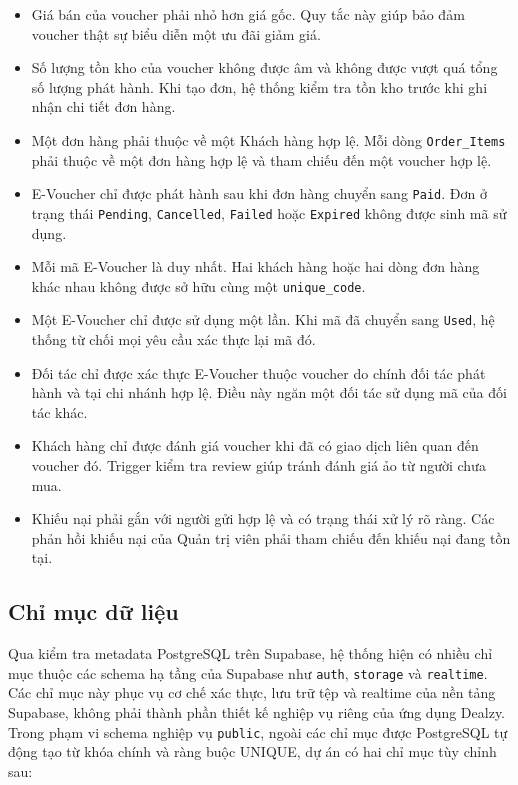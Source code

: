 \begin{itemize}[leftmargin=1.2cm]
    \item Giá bán của voucher phải nhỏ hơn giá gốc. Quy tắc này giúp bảo đảm voucher thật sự biểu diễn một ưu đãi giảm giá.
    \item Số lượng tồn kho của voucher không được âm và không được vượt quá tổng số lượng phát hành. Khi tạo đơn, hệ thống kiểm tra tồn kho trước khi ghi nhận chi tiết đơn hàng.
    \item Một đơn hàng phải thuộc về một Khách hàng hợp lệ. Mỗi dòng \texttt{Order\_Items} phải thuộc về một đơn hàng hợp lệ và tham chiếu đến một voucher hợp lệ.
    \item E-Voucher chỉ được phát hành sau khi đơn hàng chuyển sang \texttt{Paid}. Đơn ở trạng thái \texttt{Pending}, \texttt{Cancelled}, \texttt{Failed} hoặc \texttt{Expired} không được sinh mã sử dụng.
    \item Mỗi mã E-Voucher là duy nhất. Hai khách hàng hoặc hai dòng đơn hàng khác nhau không được sở hữu cùng một \texttt{unique\_code}.
    \item Một E-Voucher chỉ được sử dụng một lần. Khi mã đã chuyển sang \texttt{Used}, hệ thống từ chối mọi yêu cầu xác thực lại mã đó.
    \item Đối tác chỉ được xác thực E-Voucher thuộc voucher do chính đối tác phát hành và tại chi nhánh hợp lệ. Điều này ngăn một đối tác sử dụng mã của đối tác khác.
    \item Khách hàng chỉ được đánh giá voucher khi đã có giao dịch liên quan đến voucher đó. Trigger kiểm tra review giúp tránh đánh giá ảo từ người chưa mua.
    \item Khiếu nại phải gắn với người gửi hợp lệ và có trạng thái xử lý rõ ràng. Các phản hồi khiếu nại của Quản trị viên phải tham chiếu đến khiếu nại đang tồn tại.
\end{itemize}

\subsection{Chỉ mục dữ liệu}

Qua kiểm tra metadata PostgreSQL trên Supabase, hệ thống hiện có nhiều chỉ mục thuộc các schema hạ tầng của Supabase như \texttt{auth}, \texttt{storage} và \texttt{realtime}. Các chỉ mục này phục vụ cơ chế xác thực, lưu trữ tệp và realtime của nền tảng Supabase, không phải thành phần thiết kế nghiệp vụ riêng của ứng dụng Dealzy. Trong phạm vi schema nghiệp vụ \texttt{public}, ngoài các chỉ mục được PostgreSQL tự động tạo từ khóa chính và ràng buộc UNIQUE, dự án có hai chỉ mục tùy chỉnh sau:

